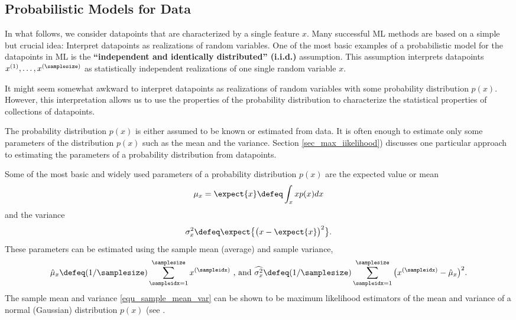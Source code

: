 \documentclass[12pt]{report}
\begin{document}
\subsection{Probabilistic Models for Data} 
In what follows, we consider datapoints that are characterized by a 
single feature $x$. Many successful ML methods are based on a simple 
but crucial idea: Interpret datapoints as realizations of random variables. 
One of the most basic examples of a probabilistic model for the 
datapoints in ML is the {\bf ``independent and identically distributed'' (i.i.d.)} 
assumption. This assumption interprets datapoints $x^{(1)},\ldots,x^{(\samplesize)}$ 
as statistically independent realizations of one single random variable $x$.

It might seem somewhat awkward to interpret datapoints as realizations 
of random variables with some probability distribution $p(x)$. However, this 
interpretation allows us to use the properties of the probability distribution  
to characterize the statistical properties of collections of datapoints. 

The probability distribution $p(x)$ is either assumed to be 
known or estimated from data. It is often enough to estimate 
only some parameters of the distribution $p(x)$ such as the 
mean and the variance. Section \ref{sec_max_iikelihood}) 
discusses one particular approach to estimating the parameters 
of a probability distribution from datapoints. 


Some of the most basic and widely used parameters of a probability 
distribution $p(x)$ are the expected value or mean 
$$\mu_{x} = \expect\{x\} \defeq \int_{x} x p(x) dx$$ 
and the variance 
$$\sigma_{x}^{2} \defeq \expect\big\{\big(x-\expect\{x\}\big)^{2}\big\}.$$ 
These parameters can be estimated using the sample mean 
(average) and sample variance, 
\begin{equation} 
\label{equ_sample_mean_var}
\hat{\mu}_{x} \defeq (1/\samplesize) \sum_{\sampleidx=1}^{\samplesize} x^{(\sampleidx)}\mbox{ , and } \widehat{\sigma^{2}_{x}} \defeq (1/\samplesize) \sum_{\sampleidx=1}^{\samplesize} \big( x^{(\sampleidx)} - \hat{\mu}_{x} \big)^{2}.  
\end{equation} 
The sample mean and variance \eqref{equ_sample_mean_var} 
can be shown to be maximum likelihood estimators of the mean 
and variance of a normal (Gaussian) distribution $p(x)$ (see \cite[Chapter 2.3.4]{BishopBook}. 
\end{document}
